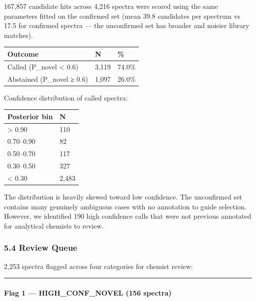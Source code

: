 167,857 candidate hits across 4,216 spectra were scored using the same
parameters fitted on the confirmed set (mean 39.8 candidates per
spectrum vs 17.5 for confirmed spectra --- the unconfirmed set has
broader and noisier library matches).

{\def\LTcaptype{none} %
\begin{longtable}[]{@{}lll@{}}
\toprule\noalign{}
Outcome & N & \% \\
\midrule\noalign{}
\endhead
\bottomrule\noalign{}
\endlastfoot
Called (P\_novel \textless{} 0.6) & 3,119 & 74.0\% \\
Abstained (P\_novel ≥ 0.6) & 1,097 & 26.0\% \\
\end{longtable}
}

Confidence distribution of called spectra:

{\def\LTcaptype{none} %
\begin{longtable}[]{@{}ll@{}}
\toprule\noalign{}
Posterior bin & N \\
\midrule\noalign{}
\endhead
\bottomrule\noalign{}
\endlastfoot
\textgreater{} 0.90 & 110 \\
0.70--0.90 & 82 \\
0.50--0.70 & 117 \\
0.30--0.50 & 327 \\
\textless{} 0.30 & 2,483 \\
\end{longtable}
}

The distribution is heavily skewed toward low confidence. The
unconfirmed set contains many genuinely ambiguous cases with no
annotation to guide selection. However, we identified 190 high
confidence calls that were not previous annotated for analytical
chemists to review.

\subsubsection{5.4 Review Queue}\label{review-queue}

2,253 spectra flagged across four categories for chemist review:

\begin{center}\rule{0.5\linewidth}{0.5pt}\end{center}

\paragraph{Flag 1 --- HIGH\_CONF\_NOVEL (156
spectra)}\label{flag-1-high_conf_novel-156-spectra}

